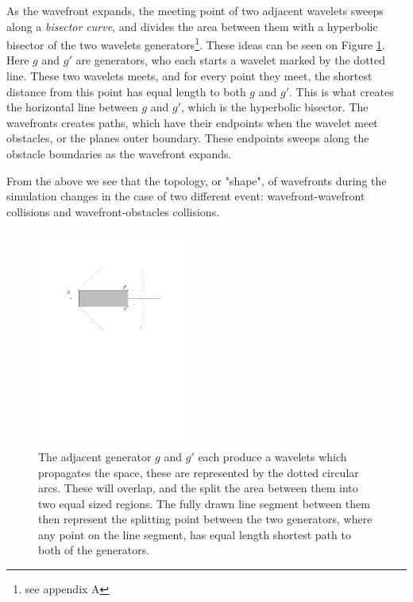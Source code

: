 As the wavefront expands, the meeting point of two adjacent wavelets sweeps along a 
\textit{bisector curve}, and divides the area between them with a hyperbolic bisector 
of the two wavelets generators\footnote{see appendix A}. These ideas can be seen on 
Figure \ref{fig:bisectorex}. Here $g$ and $g'$ are generators, who each starts a 
wavelet marked by the dotted line. These two wavelets meets, and for every point they 
meet, the shortest distance from this point has equal length to both $g$ and $g'$. 
This is what creates the horizontal line between $g$ and $g'$, which is the 
hyperbolic bisector. The wavefronts creates paths, which have their endpoints when 
the wavelet meet obstacles, or the planes outer boundary. These endpoints sweeps 
along the obstacle boundaries as the wavefront expands. 

From the above we see that the topology, or "shape", of wavefronts during the 
simulation changes in the case of two different event: wavefront-wavefront collisions 
 and wavefront-obstacles collisions. 

\begin{figure}[H]
	\centering
	\includegraphics[width=0.45\textwidth]{figures/bisectorex.pdf}
	\caption{The adjacent generator $g$ and $g'$ each produce a wavelets which propagates 
    the space, these are represented by the dotted circular arcs. These will overlap, 
    and the split the area between them into two equal sized regions. The fully drawn 
    line segment between them then represent the splitting point between the two generators, 
    where any point on the line segment, has equal length shortest path to both of the 
    generators.}
	\label{fig:bisectorex}
\end{figure}

